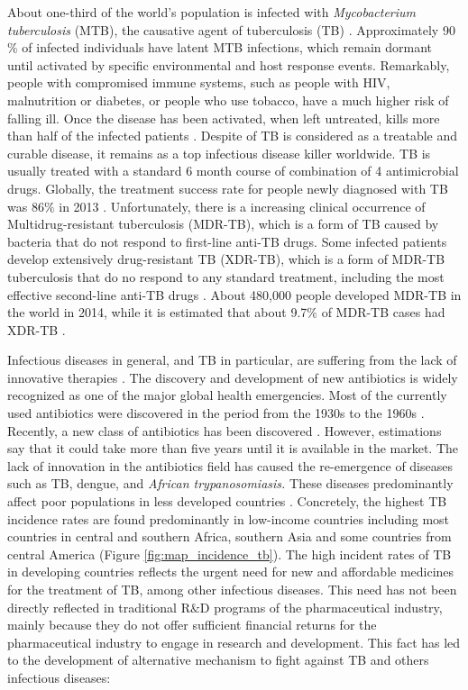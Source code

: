 \documentclass[11pt, b5paper,twoside]{tesi_upf}
\begin{document}
\par About one-third of the world's population is infected with \textit{Mycobacterium tuberculosis} (MTB), the causative agent of tuberculosis (TB) \cite{Lewandowski2015}. Approximately 90$\%$ of infected individuals have latent MTB infections, which remain dormant until activated by specific environmental and host response events. Remarkably, people with compromised immune systems, such as people with HIV, malnutrition or diabetes, or people who use tobacco, have a much higher risk of falling ill. Once the disease has been activated, when left untreated, kills more than half of the infected patients \cite{Connell2011}. Despite of TB is considered as a treatable and curable disease, it remains as a top infectious disease killer worldwide. TB is usually treated with a standard 6 month course of combination of 4 antimicrobial drugs. Globally, the treatment success rate for people newly diagnosed with TB was 86$\%$ in 2013 \cite{Lewandowski2015}. Unfortunately, there is a increasing clinical occurrence of Multidrug-resistant tuberculosis (MDR-TB), which is a form of TB caused by bacteria that do not respond to first-line anti-TB drugs. Some infected patients develop extensively drug-resistant TB (XDR-TB), which is a form of MDR-TB tuberculosis that do no respond to any standard treatment, including the most effective second-line anti-TB drugs \cite{Berry2009}. About 480,000 people developed MDR-TB in the world in 2014, while it is estimated that about 9.7$\%$ of MDR-TB cases had XDR-TB \cite{Lewandowski2015}.

\par Infectious diseases in general, and TB in particular, are suffering from the lack of innovative therapies \cite{Trouiller2016}. The discovery and development of new antibiotics is widely recognized as one of the major global health emergencies. Most of the currently used antibiotics were discovered in the period from the 1930s to the 1960s \cite{Conly2005}. Recently, a new class of antibiotics has been discovered \cite{Ling2015a}. However, estimations say that it could take more than five years until it is available in the market. The lack of innovation in the antibiotics field has caused the re-emergence of diseases such  as  TB, dengue, and \textit{African trypanosomiasis.} These diseases predominantly  affect  poor  populations in less developed countries \cite{Trouiller2016}. Concretely, the highest TB incidence rates are found predominantly in low-income countries including most countries in central and southern Africa, southern Asia and some countries from central America (Figure \ref{fig:map_incidence_tb}). The high incident rates of TB in developing countries reflects the urgent need for new and affordable medicines for the treatment of TB, among other infectious diseases. This need has not been directly reflected in traditional R$\&$D programs of the pharmaceutical industry, mainly because they do not offer sufficient financial returns for the pharmaceutical industry  to engage in research and development. This fact has led to the development of alternative mechanism to fight against TB and others infectious diseases:
\end{document}
